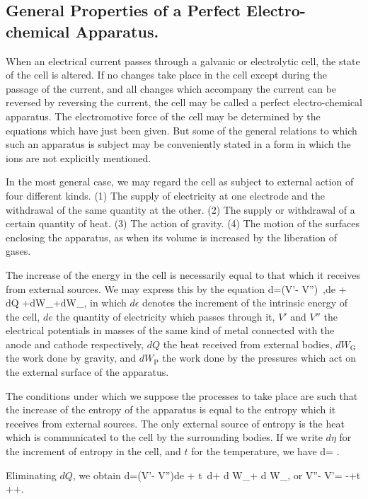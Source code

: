 \documentclass[12pt]{memoir}
\begin{document}
\subsection{General Properties of a Perfect Electro-chemical Apparatus.}
When an electrical current passes through a galvanic or electrolytic cell, the state of the cell is altered. If no changes take place in the cell except during the passage of the current, and all changes which accompany the current can be reversed by reversing the current, the cell may be called a perfect electro-chemical apparatus. The electromotive force of the cell may be determined by the equations which have just been given. But some of the general relations to which such an apparatus is subject may be conveniently stated in a form in which the ions are not explicitly mentioned.

In the most general case, we may regard the cell as subject to external action of four different kinds. (1) The supply of electricity at one electrode and the withdrawal of the same quantity at the other. (2) The supply or withdrawal of a certain quantity of heat. (3) The action of gravity. (4) The motion of the surfaces enclosing the apparatus, as when its volume is increased by the liberation of gases.

The increase of the energy in the cell is necessarily equal to that which it receives from external sources. We may express this by the equation
\eqs d\epsilon=(V'- V'')\ ,de + dQ +dW_+dW_, \label{691} \eqe
in which $d\epsilon$ denotes the increment of the intrinsic energy of the cell, $de$ the quantity of electricity which passes through it, $V'$ and $V''$ the electrical potentials in masses of the same kind of metal connected with the anode and cathode respectively, $dQ$ the heat received from external bodies, $dW_\text{G}$ the work done by gravity, and $dW_\text{P}$ the work done by the pressures which act on the external surface of the apparatus.

The conditions under which we suppose the processes to take place are such that the increase of the entropy of the apparatus is equal to the entropy which it receives from external sources. The only external source of entropy is the heat which is communicated to the cell by the surrounding bodies. If we write $d\eta$ for the increment of entropy in the cell, and $t$ for the temperature, we have
\eqs d\eta = .\label{692} \eqe

Eliminating $dQ$, we obtain
\eqs d\epsilon=(V'- V'')de + t\, d\eta + d W_+ d W_, \label{693} \eqe
or
\eqs V''- V'= -+t ++. \label{694} \eqe
\end{document}
